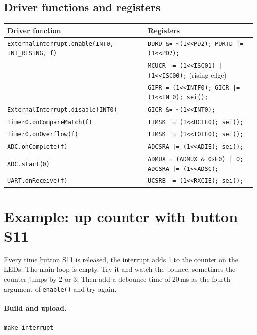 \documentclass[11pt,a4paper]{article}
\newcommand{\code}[1]{\texttt{#1}}
\begin{document}
\subsection*{Driver functions and registers}

\begin{center}
\small
{\footnotesize\begin{tabular}{@{}ll@{}}
\toprule
\textbf{Driver function} & \textbf{Registers} \\
\midrule
\code{ExternalInterrupt.enable(INT0, INT\_RISING, f)} & \code{DDRD \&= \textasciitilde(1<{}<PD2); PORTD |= (1<{}<PD2);} \\
            & \code{MCUCR |= (1<{}<ISC01) | (1<{}<ISC00);} \quad (rising edge) \\
            & \code{GIFR = (1<{}<INTF0); GICR |= (1<{}<INT0); sei();} \\
\code{ExternalInterrupt.disable(INT0)} & \code{GICR \&= \textasciitilde(1<{}<INT0);} \\
\code{Timer0.onCompareMatch(f)} & \code{TIMSK |= (1<{}<OCIE0); sei();} \\
\code{Timer0.onOverflow(f)}     & \code{TIMSK |= (1<{}<TOIE0); sei();} \\
\code{ADC.onComplete(f)}        & \code{ADCSRA |= (1<{}<ADIE); sei();} \\
\code{ADC.start(0)}             & \code{ADMUX = (ADMUX \& 0xE0) | 0; ADCSRA |= (1<{}<ADSC);} \\
\code{UART.onReceive(f)}        & \code{UCSRB |= (1<{}<RXCIE); sei();} \\
\bottomrule
\end{tabular}}
\end{center}

\newpage
\section{Example: up counter with button S11}

Every time button S11 is released, the interrupt adds 1 to the counter on the
LEDs. The main loop is empty. Try it and watch the bounce: sometimes the
counter jumps by 2 or 3. Then add a debounce time of 20\,ms as the fourth
argument of \code{enable()} and try again.

\paragraph{Build and upload.} \code{make interrupt}


\end{document}
